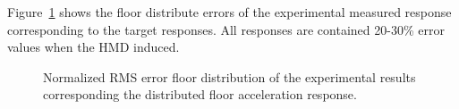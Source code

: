 Figure~\ref{fig:7-17} shows the floor distribute errors of the experimental measured response corresponding to the target responses. All responses are contained 20-30\% error values when the HMD induced.

\begin{figure}[!ht]
\centering
{}
\caption{Normalized RMS error floor distribution of the experimental results corresponding the distributed floor acceleration response.}
\label{fig:7-17}
\end{figure}

